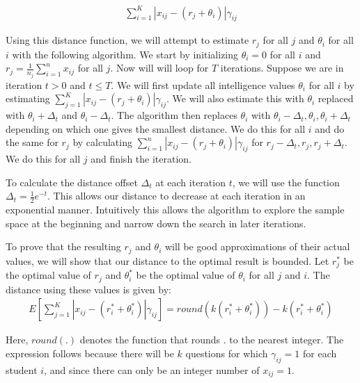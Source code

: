 \documentclass[psamsfonts]{amsart}
\begin{document}
\begin{eqnarray}
\sum_{i=1}^K | x_{ij} - (r_j + \theta_i)| \gamma_{ij}
\end{eqnarray}

Using this distance function, we will attempt to estimate $r_j$ for all $j$ and $\theta_i$ for all $i$ with the following algorithm. We start by initializing $\theta_i = 0$ for all $i$ and $r_j = \frac{1}{n_j} \sum_{i=1}^n x_{ij}$ for all $j$. Now will will loop for $T$ iterations. Suppose we are in iteration $t > 0$ and $t \leq T$. We will first update all intelligence values $\theta_i$ for all $i$ by estimating $\sum_{j=1}^K |x_{ij} - (r_j + \theta_i)| \gamma_{ij}$. We will also estimate this with $\theta_i$ replaced with $\theta_i + \Delta_t$ and $\theta_i - \Delta_t$. The algorithm then replaces $\theta_i$ with $\theta_i - \Delta_t, \theta_i, \theta_i + \Delta_t$ depending on which one gives the smallest distance. We do this for all $i$ and do the same for $r_j$ by calculating $\sum_{i=1}^n |x_{ij} - (r_j + \theta_i)| \gamma_{ij}$ for $r_j - \Delta_t, r_j, r_j + \Delta_t$. We do this for all $j$ and finish the iteration.

To calculate the distance offset $\Delta_t$ at each iteration $t$, we will use the function $\Delta_t = \frac{1}{2} e^{-t}$. This allows our distance to decrease at each iteration in an exponential manner. Intuitively this allows the algorithm to explore the sample space at the beginning and narrow down the search in later iterations.

To prove that the resulting $r_j$ and $\theta_i$ will be good approximations of their actual values, we will show that our distance to the optimal result is bounded. Let $r^*_j$ be the optimal value of $r_j$ and $\theta^*_i$ be the optimal value of $\theta_i$ for all $j$ and $i$. The distance using these values is given by:
\begin{eqnarray}
E \left[ \sum_{j=1}^K | x_{ij} - (r^*_i + \theta^*_i) | \gamma_{ij} \right] = round(k ( r^*_i + \theta^*_i)) - k ( r^*_i + \theta^*_i)
\end{eqnarray}

Here, $round(.)$ denotes the function that rounds $.$ to the nearest integer. The expression follows because there will be $k$ questions for which $\gamma_{ij} = 1$ for each student $i$, and since there can only be an integer number of $x_{ij} = 1$. 
\end{document}
